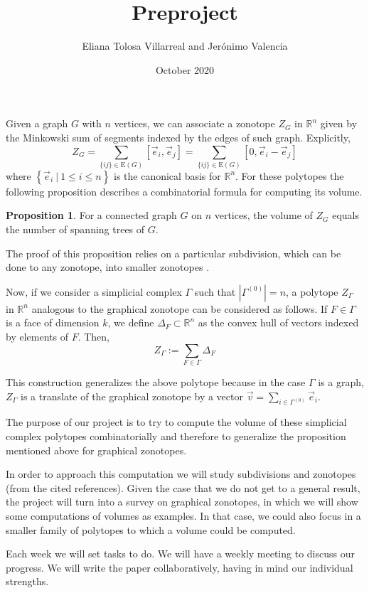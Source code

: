 \documentclass[english]{article}
\title{Preproject}
\author{Eliana Tolosa Villarreal and Jerónimo Valencia}
\date{October 2020}
\theoremstyle{definition}
\theoremstyle{definition}
\newtheorem{proposition}{Proposition}[section]
\theoremstyle{definition}
\theoremstyle{remark}
\begin{document}
\maketitle

Given a graph $G$ with $n$ vertices, we can associate a zonotope $Z_G$ in $\mathbb{R}^n$ given by the Minkowski sum of segments indexed by the edges of such graph. Explicitly, $$Z_G = \sum_{\{ij\}\in\text{E}(G)}\left[\vec{e}_i,\vec{e}_j\right] = \sum_{\{ij\}\in\text{E}(G)}\left[0,\vec{e}_i-\vec{e}_j\right]$$
where $\left\{\vec{e}_i \ | \ 1\leq i\leq n \right\}$ is the canonical basis for $\mathbb{R}^n$. For these polytopes the following proposition describes a combinatorial formula for computing its volume. 

\begin{proposition}
\cite[Proposition 2.4]{Postnikov-PAB} For a connected graph $G$ on $n$ vertices, the volume of $Z_G$ equals the number of spanning trees of $G$. 
\end{proposition}

The proof of this proposition relies on a particular subdivision, which can be done to any zonotope, into smaller zonotopes \cite{beck2008computing}. 

Now, if we consider a simplicial complex $\Gamma$ such that $|\Gamma^{(0)}|=n$, a polytope $Z_\Gamma$ in $\mathbb{R}^n$ analogous to the graphical zonotope can be considered as follows. If $F\in\Gamma$ is a face of dimension $k$, we define $\Delta_F \subset \mathbb{R}^n$ as the convex hull of vectors indexed by elements of $F$. Then, $$Z_\Gamma := \sum_{F\in\Gamma}\Delta_F$$

This construction generalizes the above polytope because in the case $\Gamma$ is a graph, $Z_\Gamma$ is a translate of the graphical zonotope by a vector $\vec{v} = \sum_{i\in \Gamma^{(0)}}\vec{e}_i$. 

The purpose of our project is to try to compute the volume of these simplicial complex polytopes combinatorially and therefore to generalize the proposition mentioned above for graphical zonotopes.

In order to approach this computation we will study subdivisions and zonotopes (from the cited references). Given the case that we do not get to a general result, the project will turn into a survey on graphical zonotopes, in which we will show some computations of volumes as examples. In that case, we could also focus in a smaller family of polytopes to which a volume could be computed.

Each week we will set tasks to do. We will have a weekly meeting to discuss our progress. We will write the paper collaboratively, having in mind our individual strengths.


\nocite{*}

\printbibliography
\end{document}
